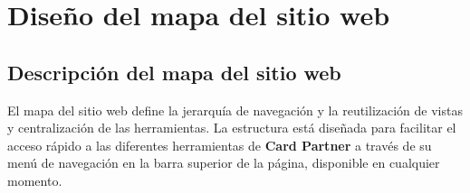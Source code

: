 \documentclass[10pt]{article}
\begin{document}
		

	\section{Diseño del mapa del sitio web}
	\subsection*{Descripción del mapa del sitio web}
	El mapa del sitio web define la jerarquía de navegación y la reutilización de vistas y centralización de las herramientas. La estructura está diseñada para facilitar el acceso rápido a las diferentes herramientas de \textbf{Card Partner} a través de su menú de navegación en la barra superior de la página, disponible en cualquier momento.\\
	
\end{document}
